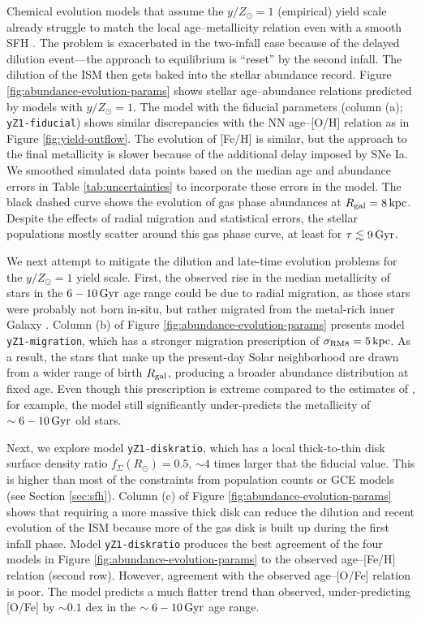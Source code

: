 \documentclass[twocolumn,twocolappendix,linenumbers]{aastex631}
\newcommand{\yZ}[1]{$y/Z_\odot=#1$}
\newcommand{\kpc}{\,{\rm kpc}}
\newcommand{\Gyr}{\,{\rm Gyr}}
\begin{document}
Chemical evolution models that assume the \yZ{1} (empirical) yield scale already struggle to match the local age--metallicity relation even with a smooth SFH \citep[see also][]{johnson_milky_2024}. The problem is exacerbated in the two-infall case because of the delayed dilution event---the approach to equilibrium is ``reset'' by the second infall. The dilution of the ISM then gets baked into the stellar abundance record.
Figure \ref{fig:abundance-evolution-params} shows stellar age--abundance relations predicted by models with \yZ{1}. The model with the fiducial parameters (column (a); {\tt yZ1-fiducial}) shows similar discrepancies with the \citet{leung_variational_2023} NN age--[O/H] relation as in Figure \ref{fig:yield-outflow}. The evolution of [Fe/H] is similar, but the approach to the final metallicity is slower because of the additional delay imposed by SNe Ia. We smoothed simulated data points based on the median age and abundance errors in Table \ref{tab:uncertainties} to incorporate these errors in the model. The black dashed curve shows the evolution of gas phase abundances at $R_{\rm gal}=8\kpc$. Despite the effects of radial migration and statistical errors, the stellar populations mostly scatter around this gas phase curve, at least for $\tau\lesssim9\Gyr$.

We next attempt to mitigate the dilution and late-time evolution problems for the \yZ{1} yield scale. First, the observed rise in the median metallicity of stars in the $6-10\Gyr$ age range could be due to radial migration, as those stars were probably not born in-situ, but rather migrated from the metal-rich inner Galaxy \citep{feuillet_age-resolved_2018}. Column (b) of Figure \ref{fig:abundance-evolution-params} presents model {\tt yZ1-migration}, which has a stronger migration prescription of $\sigma_{\rm RM8}=5\kpc$. As a result, the stars that make up the present-day Solar neighborhood are drawn from a wider range of birth $R_{\rm gal}$, producing a broader abundance distribution at fixed age. Even though this prescription is extreme compared to the estimates of \citet{frankel_measuring_2018}, for example, the model still significantly under-predicts the metallicity of $\sim6-10\,{\rm Gyr}$ old stars.

Next, we explore model {\tt yZ1-diskratio}, which has a local thick-to-thin disk surface density ratio $f_\Sigma(R_\odot)=0.5$, $\sim4$ times larger that the fiducial value. This is higher than most of the constraints from population counts or GCE models (see Section \ref{sec:sfh}). Column (c) of Figure \ref{fig:abundance-evolution-params} shows that requiring a more massive thick disk can reduce the dilution and recent evolution of the ISM because more of the gas disk is built up during the first infall phase. Model {\tt yZ1-diskratio} produces the best agreement of the four models in Figure \ref{fig:abundance-evolution-params} to the observed age--[Fe/H] relation (second row). However, agreement with the observed age--[O/Fe] relation is poor. The model predicts a much flatter trend than observed, under-predicting [O/Fe] by $\sim0.1$ dex in the $\sim6-10\Gyr$ age range.
\end{document}
